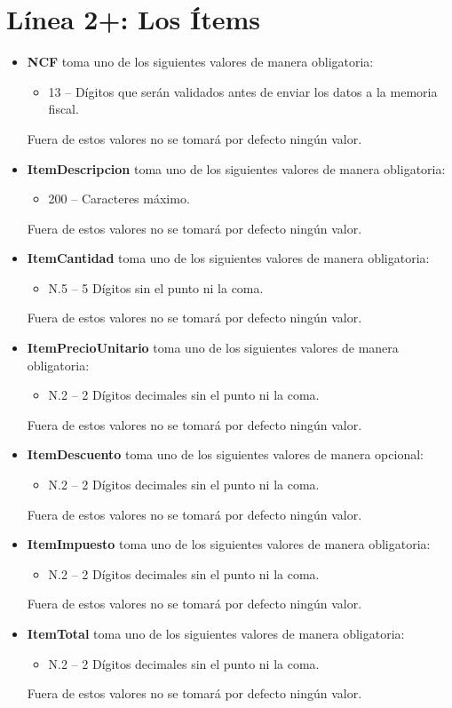 \documentclass{article}
\begin{document}
\section*{Línea 2+: Los Ítems}
\begin{itemize}
    \item \textbf{NCF} toma uno de los siguientes valores de manera obligatoria:
    \begin{itemize}
        \item 13 – Dígitos que serán validados antes de enviar los datos a la memoria fiscal.
    \end{itemize}
    Fuera de estos valores no se tomará por defecto ningún valor.

    \item \textbf{ItemDescripcion} toma uno de los siguientes valores de manera obligatoria:
    \begin{itemize}
        \item 200 – Caracteres máximo.
    \end{itemize}
    Fuera de estos valores no se tomará por defecto ningún valor.

    \item \textbf{ItemCantidad} toma uno de los siguientes valores de manera obligatoria:
    \begin{itemize}
        \item N.5 – 5 Dígitos sin el punto ni la coma.
    \end{itemize}
    Fuera de estos valores no se tomará por defecto ningún valor.

    \item \textbf{ItemPrecioUnitario} toma uno de los siguientes valores de manera obligatoria:
    \begin{itemize}
        \item N.2 – 2 Dígitos decimales sin el punto ni la coma.
    \end{itemize}
    Fuera de estos valores no se tomará por defecto ningún valor.

    \item \textbf{ItemDescuento} toma uno de los siguientes valores de manera opcional:
    \begin{itemize}
        \item N.2 – 2 Dígitos decimales sin el punto ni la coma.
    \end{itemize}
    Fuera de estos valores no se tomará por defecto ningún valor.

    \item \textbf{ItemImpuesto} toma uno de los siguientes valores de manera obligatoria:
    \begin{itemize}
        \item N.2 – 2 Dígitos decimales sin el punto ni la coma.
    \end{itemize}
    Fuera de estos valores no se tomará por defecto ningún valor.

    \item \textbf{ItemTotal} toma uno de los siguientes valores de manera obligatoria:
    \begin{itemize}
        \item N.2 – 2 Dígitos decimales sin el punto ni la coma.
    \end{itemize}
    Fuera de estos valores no se tomará por defecto ningún valor.
\end{itemize}
\end{document}
